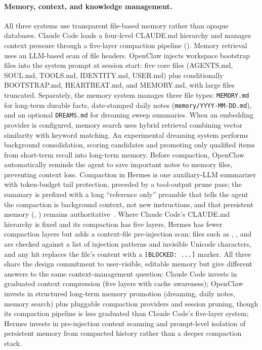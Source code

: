 \paragraph{Memory, context, and knowledge management.}
All three systems use transparent file-based memory rather than opaque databases. Claude Code loads a four-level CLAUDE.md hierarchy and manages context pressure through a five-layer compaction pipeline (). Memory retrieval uses an LLM-based scan of file headers. OpenClaw injects workspace bootstrap files into the system prompt at session start: five core files (AGENTS.md, SOUL.md, TOOLS.md, IDENTITY.md, USER.md) plus conditionally BOOTSTRAP.md, HEARTBEAT.md, and MEMORY.md, with large files truncated. Separately, the memory system manages three file types: \texttt{MEMORY.md} for long-term durable facts, date-stamped daily notes (\texttt{memory/YYYY-MM-DD.md}), and an optional \texttt{DREAMS.md} for dreaming sweep summaries. When an embedding provider is configured, memory search uses hybrid retrieval combining vector similarity with keyword matching. An experimental dreaming system performs background consolidation, scoring candidates and promoting only qualified items from short-term recall into long-term memory. Before compaction, OpenClaw automatically reminds the agent to save important notes to memory files, preventing context loss. Compaction in Hermes is one auxiliary-LLM summarizer with token-budget tail protection, preceded by a tool-output prune pass; the summary is prefixed with a long ``reference only'' preamble that tells the agent the compaction is background context, not new instructions, and that persistent memory (, ) remains authoritative~\tierB{}. Where Claude Code's CLAUDE.md hierarchy is fixed and its compaction has five layers, Hermes has fewer compaction layers but adds a context-file pre-injection scan: files such as , , and  are checked against a list of injection patterns and invisible Unicode characters, and any hit replaces the file's content with a \texttt{[BLOCKED: ...]} marker. All three share the design commitment to user-visible, editable memory but give different answers to the same context-management question: Claude Code invests in graduated context compression (five layers with cache awareness); OpenClaw invests in structured long-term memory promotion (dreaming, daily notes, memory search) plus pluggable compaction providers and session pruning, though its compaction pipeline is less graduated than Claude Code's five-layer system; Hermes invests in pre-injection content scanning and prompt-level isolation of persistent memory from compacted history rather than a deeper compaction stack.

